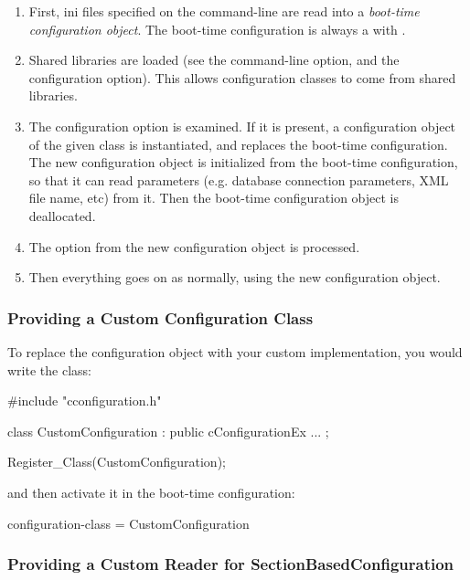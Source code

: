 \begin{enumerate}
  \item First, ini files specified on the command-line are read into a
     \textit{boot-time configuration object}. The boot-time configuration
     is always a  with
     .
  \item Shared libraries are loaded (see the  command-line option,
     and the  configuration option). This allows
     configuration classes to come from shared libraries.
  \item The  configuration option is examined.
     If it is present, a configuration object of the given class
     is instantiated, and replaces the boot-time configuration.
     The new configuration object is initialized from the boot-time
     configuration, so that it can read parameters (e.g. database
     connection parameters, XML file name, etc) from it.
     Then the boot-time configuration object is deallocated.
  \item The  option from the new configuration object is
     processed.
  \item Then everything goes on as normally, using the new configuration
     object.
\end{enumerate}

\subsubsection{Providing a Custom Configuration Class}

To replace the configuration object with your custom implementation,
you would write the class:

\begin{cpp}
#include "cconfiguration.h"

class CustomConfiguration : public cConfigurationEx
{
   ...
};

Register_Class(CustomConfiguration);
\end{cpp}

and then activate it in the boot-time configuration:

\begin{inifile}
[General]
configuration-class = CustomConfiguration
\end{inifile}


\subsubsection{Providing a Custom Reader for SectionBasedConfiguration}

